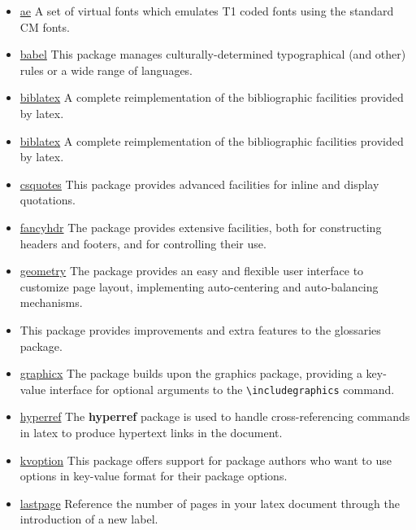 \documentclass[a4paper, 11pt]{article}
\begin{document}
\begin{itemize}
    \item \href{https://www.ctan.org/pkg/ae}{ae} A set of virtual fonts which emulates T1 coded fonts using the standard CM fonts.
    \item \href{https://www.ctan.org/pkg/babel}{babel} This package manages culturally-determined typographical (and other) rules
          or a wide range of languages.
    \item \href{https://www.ctan.org/pkg/biblatex}{biblatex} A complete reimplementation of the bibliographic facilities provided by \gls{latex}.
    \item \href{https://www.ctan.org/pkg/biblatex}{biblatex} A complete reimplementation of the bibliographic facilities provided by \gls{latex}.
    \item \href{https://www.ctan.org/pkg/csquotes}{csquotes} This package provides advanced facilities for inline and display quotations.
    \item \href{https://www.ctan.org/pkg/fancyhdr}{fancyhdr} The package provides extensive facilities, both for constructing headers
          and footers, and for controlling their use.
    \item \href{https://www.ctan.org/pkg/geometry}{geometry} The package provides an easy and flexible user interface to customize
          page layout, implementing auto-centering and auto-balancing mechanisms.
    \item \href{https://www.ctan.org/pkg/glossaries}{} This package provides improvements and extra features
          to the glossaries package.
    \item \href{https://www.ctan.org/pkg/graphicx}{graphicx} The package builds upon the graphics package, providing a key-value
          interface for optional arguments to the \verb=\includegraphics= command.
    \item \href{https://www.ctan.org/pkg/hyperref}{hyperref} The \textbf{hyperref} package is used to handle cross-referencing commands in
          \gls{latex} to produce hypertext links in the document.
    \item \href{https://www.ctan.org/pkg/kvoptions}{kvoption} This package offers support for package authors who want to use options
          in key-value format for their package options.
    \item \href{https://www.ctan.org/pkg/lastpage}{lastpage} Reference the number of pages in your \gls{latex} document through the
          introduction of a new label.

\end{itemize}
\end{document}

